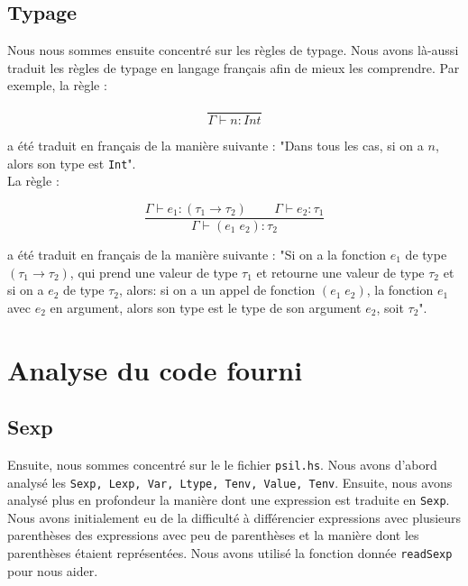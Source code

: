 \documentclass[10pt,a4paper]{article}
\begin{document}
\subsection{Typage}

Nous nous sommes ensuite concentré sur les règles de typage. Nous avons là-aussi traduit les règles de typage en langage français afin de mieux les comprendre. Par exemple, la règle :

\begin{equation}
    \frac{ }{\Gamma \vdash n : Int}
\end{equation}

a été traduit en français de la manière suivante : "Dans tous les cas, si on a $n$, alors son type est \texttt{Int}".\\

La règle :

\begin{equation}
    \frac{\Gamma \vdash e_1 : (\tau_1 \rightarrow \tau_2) \;\;\;\;\;\;\;\ \Gamma \vdash e_2 : \tau_1}{\Gamma \vdash (e_1 \; e_2) : \tau_2}
\end{equation}

a été traduit en français de la manière suivante : "Si on a la fonction $e_1$ de type $(\tau_1 \rightarrow \tau_2)$, qui prend une valeur de type $\tau_1$ et retourne une valeur de type $\tau_2$ et si on a $e_2$ de type $\tau_2$, alors: si on a un appel de fonction $(e_1 \; e_2)$, la fonction $e_1$ avec $e_2$ en argument, alors son type est le type de son argument $e_2$, soit $\tau_2$".

\section{Analyse du code fourni}
\subsection{Sexp}

Ensuite, nous sommes concentré sur le le fichier \texttt{psil.hs}. Nous avons d'abord analysé les \texttt{Sexp, Lexp, Var, Ltype, Tenv, Value, Tenv}. Ensuite, nous avons analysé plus en profondeur la manière dont une expression est traduite en \texttt{Sexp}. Nous avons initialement eu de la difficulté à différencier expressions avec plusieurs parenthèses des expressions avec peu de parenthèses et la manière dont les parenthèses étaient représentées. Nous avons utilisé la fonction donnée \texttt{readSexp} pour nous aider.\\
\end{document}
